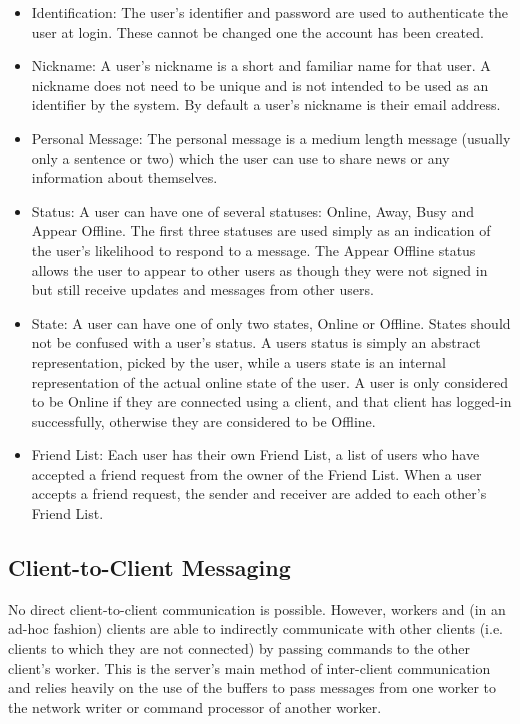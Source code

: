 \begin{itemize}
\item{Identification:
The user's identifier and password are used to authenticate the user at login. These cannot be changed one the account has been created.} 

\item{Nickname:
A user's nickname is a short and familiar name for that user. A nickname does not need to be unique and is not intended to be used as an identifier by the system. By default a user's nickname is their email address.}

\item{Personal Message:
The personal message is a medium length message (usually only a sentence or two) which the user can use to share news or any information about themselves.}

\item{Status:
A user can have one of several statuses: Online, Away, Busy and Appear Offline. The first three statuses are used simply as an indication of the user's likelihood to respond to a message. The Appear Offline status allows the user to appear to other users as though they were not signed in but still receive updates and messages from other users.}

\item{State:
A user can have one of only two states, Online or Offline. States should not be confused with a user's status. A users status is simply an abstract representation, picked by the user, while a users state is an internal representation of the actual online state of the user. A user is only considered to be Online if they are connected using a client, and that client has logged-in successfully, otherwise they are considered to be Offline.}

\item{Friend List:
Each user has their own Friend List, a list of users who have accepted a friend request from the owner of the Friend List. When a user accepts a friend request, the sender and receiver are added to each other's Friend List.}
\end{itemize}

\subsection{Client-to-Client Messaging}
\label{c2c}
No direct client-to-client communication is possible. However, workers and (in an ad-hoc fashion) clients are able to indirectly communicate with other clients (i.e. clients to which they are not connected) by passing commands to the other client's worker. This is the server's main method of inter-client communication and relies heavily on the use of the buffers to pass messages from one worker to the network writer or command processor of another worker.

